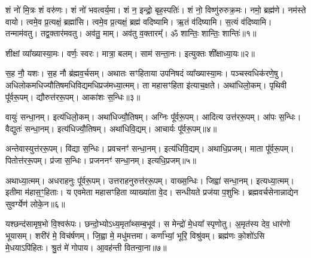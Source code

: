 \setcounter{anuvakam}{0}

शं नो॑ मि॒त्रः शं वरु॑णः। 
शं नो॑ भवत्वर्य॒मा। 
शं न॒ इन्द्रो॒ बृह॒स्पतिः॑। 
शं नो॒ विष्णु॑रुरुक्र॒मः। 
नमो॒ ब्रह्म॑णे। 
नम॑स्ते वायो। 
त्वमे॒व प्र॒त्यक्षं॒ ब्रह्मा॑सि। 
त्वमे॒व प्र॒त्यक्षं॒ ब्रह्म॑ वदिष्यामि। 
ऋ॒तं व॑दिष्यामि। 
स॒त्यं व॑दिष्यामि। 
तन्माम॑वतु। 
तद्व॒क्तार॑मवतु। 
अव॑तु॒ माम्। 
अव॑तु व॒क्तारम्᳚। 
ॐ शान्तिः॒ शान्तिः॒ शान्तिः॑॥१॥%
\anuvakamend[स॒त्यं व॑दिष्यामि॒ पञ्च॑ च]

शीक्षां व्या᳚ख्यास्या॒मः। 
वर्णः॒ स्वरः। 
मात्रा॒ बलम्। 
साम॑ सन्ता॒नः। 
इत्युक्तः शी᳚क्षाध्या॒यः॥२॥
\anuvakamend[शीक्षां पञ्च॑]

स॒ह नौ॒ यशः। 
स॒ह नौ ब्र॑ह्मव॒र्चसम्। 
अथातः सꣳहिताया उपनिषदं व्या᳚ख्यास्या॒मः। 
पञ्चस्वधिक॑रणे॒षु। 
अधिलोकमधि\-ज्यौतिषमधि\-विद्यमधि\-प्रज॑मध्या॒त्मम्। 
ता महा\-सꣳहिता इ॑त्याच॒क्षते। 
अथा॑धिलो॒कम्। 
पृथिवी पू᳚र्व\-रू॒पम्। 
द्यौरुत्त॑र\-रू॒पम्। 
आका॑शः स॒न्धिः॥३॥

वायुः॑ सन्धा॒नम्। 
इत्य॑धि\-लो॒कम्। 
अथा॑धिज्यौ॒तिषम्। 
अग्निः पू᳚र्व\-रू॒पम्। 
आदित्य उत्त॑र\-रू॒पम्। 
आ॑पः स॒न्धिः। 
वैद्युतः॑ सन्धा॒नम्। 
इत्य॑धि\-ज्यौ॒तिषम्। 
अथा॑धिवि॒द्यम्। 
आचार्यः पू᳚र्वरू॒पम्॥४॥

अन्तेवास्युत्त॑र\-रू॒पम्। 
वि॑द्या स॒न्धिः। 
प्रवचनꣳ॑ सन्धा॒नम्। 
इत्य॑धि\-वि॒द्यम्। 
अथाधि॒प्रजम्। 
माता पू᳚र्व\-रू॒पम्। 
पितोत्त॑र\-रू॒पम्। 
प्र॑जा स॒न्धिः। 
प्रजननꣳ॑ सन्धा॒नम्। 
इत्यधि॒प्रजम्॥५॥

अथाध्या॒त्मम्। 
अधराहनुः पू᳚र्व\-रू॒पम्। 
उत्तराहनुरुत्त॑र\-रू॒पम्। 
वाख्स॒न्धिः। 
जिह्वा॑ सन्धा॒नम्। 
इत्यध्या॒त्मम्। 
इतीमा म॑हा\-स॒ꣳ॒हिताः। 
य एवमेता महा\-सꣳहिता व्याख्या॑ता वे॒द। 
सन्धीयते प्रज॑या प॒शुभिः। 
ब्रह्मवर्चसेनान्नाद्येन सुवर्ग्येण॑ लोके॒न॥६॥
\anuvakamend[स॒न्धिराचार्यः पू᳚र्वरू॒पमित्यधि॒प्रजं लो॑के॒न]

यश्छन्द॑सामृष॒भो वि॒श्वरू॑पः। 
छन्दो॒भ्योऽध्य॒मृता᳚थ्सम्ब॒भूव॑। 
स मेन्द्रो॑ मे॒धया᳚ स्पृणोतु। 
अ॒मृत॑स्य देव॒ धार॑णो भूयासम्। 
शरी॑रं मे॒ विच॑र्\mbox{}षणम्। 
जि॒ह्वा मे॒ मधु॑मत्तमा। 
कर्णा᳚भ्यां॒ भूरि॒ विश्रु॑वम्। 
ब्रह्म॑णः को॒शो॑ऽसि मे॒धयाऽपि॑हितः। 
श्रु॒तं मे॑ गोपाय। 
आ॒वह॑न्ती वितन्वा॒ना॥७॥

